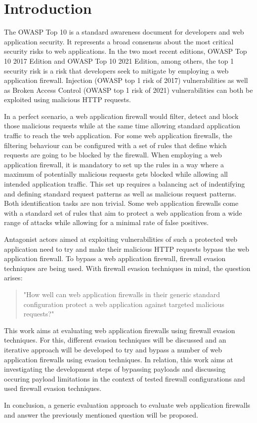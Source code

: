 \section{Introduction}
The OWASP Top 10 is a standard awareness document for developers and web application security. It represents a broad consensus about the most critical security risks to web applications. \cite{OWASP/Top10} In the two most recent editions, OWASP Top 10 2017 Edition and OWASP Top 10 2021 Edition, among others, the top 1 security risk is a risk that developers seek to mitigate by employing a web application firewall. \cite{OWASP/Risks2017,OWASP/Risks2021} Injection (OWASP top 1 risk of 2017) vulnerabilities as well as Broken Access Control (OWASP top 1 risk of 2021) vulnerabilities can both be exploited using malicious HTTP requests. \cite{OWASP/Injection,OWASP/BrokenAccessControl}

In a perfect scenario, a web application firewall would filter, detect and block those malicious requests while at the same time allowing standard application traffic to reach the web application. For some web application firewalls, the filtering behaviour can be configured with a set of rules that define which requests are going to be blocked by the firewall. \cite{OWASP/CRS,wargio/naxsiRules,Cisco/SnortRulesDocs}
When employing a web application firewall, it is mandatory to set up the rules in a way where a maximum of potentially malicious requests gets blocked while allowing all intended application traffic. This set up requires a balancing act of indentifying and defining standard request patterns as well as malicious request patterns. Both identification tasks are non trivial. Some web application firewalls come with a standard set of rules that aim to protect a web application from a wide range of attacks while allowing for a minimal rate of false positives. \cite{OWASP/CRS,wargio/naxsiRules,Cisco/SnortRulesDownload}

Antagonist actors aimed at exploiting vulnerabilities of such a protected web application need to try and make their malicious HTTP requests bypass the web application firewall. To bypass a web application firewall, firewall evasion techniques are being used. \cite{HackTricks/WAFBypass} With firewall evasion techniques in mind, the question arises: 
\begin{quote} "How well can web application firewalls in their generic standard configuration protect a web application against targeted malicious requests?" 
\end{quote}
This work aims at evaluating web application firewalls using firewall evasion techniques. For this, different evasion techniques will be discussed and an iterative approach will be developed to try and bypass a number of web application firewalls using evasion techniques. In relation, this work aims at investigating the development steps of bypassing payloads and discussing occuring payload limitations in the context of tested firewall configurations and used firewall evasion techniques.

In conclusion, a generic evaluation approach to evaluate web application firewalls and answer the previously mentioned question will be proposed.
